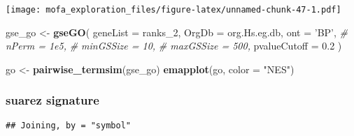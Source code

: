 \documentclass[
]{article}
\newenvironment{Shaded}{\begin{snugshade}}{\end{snugshade}}
\newcommand{\CommentTok}[1]{\textcolor[rgb]{0.56,0.35,0.01}{\textit{#1}}}
\newcommand{\DataTypeTok}[1]{\textcolor[rgb]{0.13,0.29,0.53}{#1}}
\newcommand{\DecValTok}[1]{\textcolor[rgb]{0.00,0.00,0.81}{#1}}
\newcommand{\FloatTok}[1]{\textcolor[rgb]{0.00,0.00,0.81}{#1}}
\newcommand{\KeywordTok}[1]{\textcolor[rgb]{0.13,0.29,0.53}{\textbf{#1}}}
\newcommand{\NormalTok}[1]{#1}
\newcommand{\OperatorTok}[1]{\textcolor[rgb]{0.81,0.36,0.00}{\textbf{#1}}}
\newcommand{\StringTok}[1]{\textcolor[rgb]{0.31,0.60,0.02}{#1}}
\begin{document}
\texttt{[image: mofa\_exploration\_files/figure-latex/unnamed-chunk-47-1.pdf]}

\begin{Shaded}
\begin{Highlighting}[]
\NormalTok{gse_go <-}\StringTok{ }\KeywordTok{gseGO}\NormalTok{(}
  \DataTypeTok{geneList =}\NormalTok{ ranks_}\DecValTok{2}\NormalTok{,}
  \DataTypeTok{OrgDb =}\NormalTok{ org.Hs.eg.db,}
  \DataTypeTok{ont =} \StringTok{'BP'}\NormalTok{,}
  \CommentTok{# nPerm = 1e5,}
  \CommentTok{# minGSSize = 10,}
  \CommentTok{# maxGSSize = 500,}
  \DataTypeTok{pvalueCutoff =} \FloatTok{0.2}
\NormalTok{)}

\NormalTok{go <-}\StringTok{ }\KeywordTok{pairwise_termsim}\NormalTok{(gse_go) }
\KeywordTok{emapplot}\NormalTok{(go, }\DataTypeTok{color =} \StringTok{"NES"}\NormalTok{)}
\end{Highlighting}
\end{Shaded}

\hypertarget{suarez-signature-1}{%
\subsubsection{suarez signature}\label{suarez-signature-1}}

\begin{Shaded}
\end{Shaded}

\begin{verbatim}
## Joining, by = "symbol"
\end{verbatim}
\end{document}
